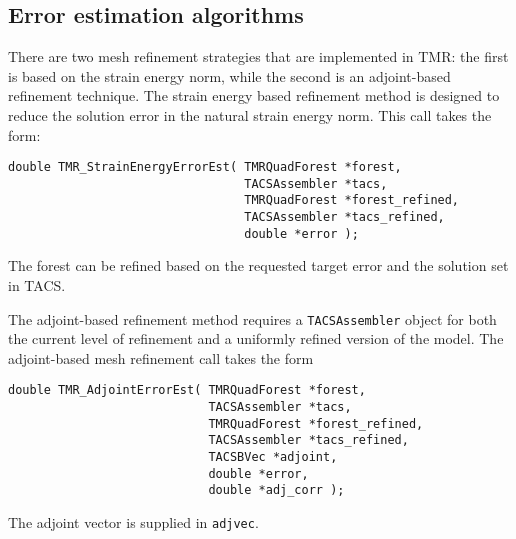 \documentclass[12pt]{article}
\begin{document}
\subsection{Error estimation algorithms}

There are two mesh refinement strategies that are implemented in TMR: the first is based on the strain energy norm, while the second is an adjoint-based refinement technique.
The strain energy based refinement method is designed to reduce the solution error in the natural strain energy norm.
This call takes the form:
%
\begin{verbatim}
double TMR_StrainEnergyErrorEst( TMRQuadForest *forest,
                                 TACSAssembler *tacs,
                                 TMRQuadForest *forest_refined,
                                 TACSAssembler *tacs_refined,
                                 double *error );
\end{verbatim}
%
The forest can be refined based on the requested target error and the solution set in TACS.

The adjoint-based refinement method requires a \texttt{TACSAssembler} object for both the current level of refinement and a uniformly refined version of the model. 
The adjoint-based mesh refinement call takes the form
\begin{verbatim}
double TMR_AdjointErrorEst( TMRQuadForest *forest,
                            TACSAssembler *tacs,
                            TMRQuadForest *forest_refined,
                            TACSAssembler *tacs_refined,
                            TACSBVec *adjoint,
                            double *error,
                            double *adj_corr );
\end{verbatim}
The adjoint vector is supplied in \texttt{adjvec}.



\end{document}
